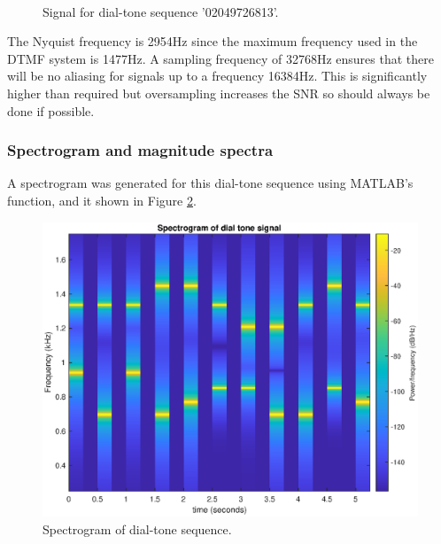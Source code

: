 \begin{figure}[H]
    \centering
    \\
    \caption{Signal for dial-tone sequence '02049726813'.}
    \label{fig:toneseqs}
\end{figure}

\noindent
The Nyquist frequency is 2954Hz since the maximum frequency used in the DTMF system is 1477Hz. A sampling frequency of 32768Hz ensures that there will be no aliasing for signals up to a frequency 16384Hz. This is significantly higher than required  but oversampling increases the SNR so should always be done if possible.

\subsubsection{Spectrogram and magnitude spectra}

A spectrogram was generated for this dial-tone sequence using MATLAB's  function, and it shown in Figure \ref{fig:spec}.

\begin{figure}[H]
    \centering
    \includegraphics[width=12cm]{assignment3figs/spec1.eps}
    \caption{Spectrogram of dial-tone sequence.}
    \label{fig:spec}
\end{figure}

